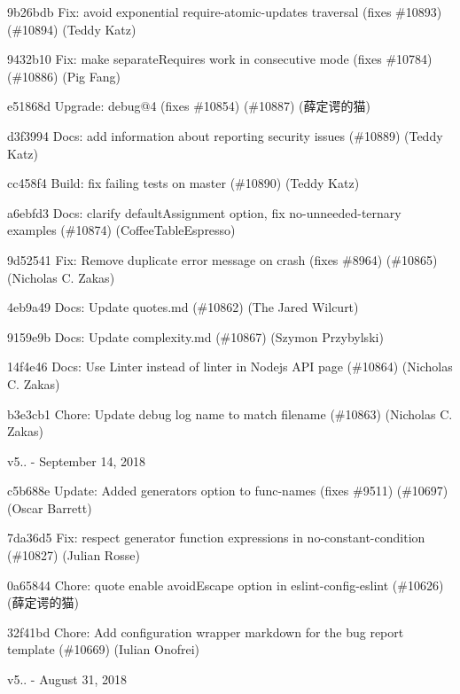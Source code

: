 \begin{DoxyItemize}
\item 9b26bdb Fix\+: avoid exponential require-\/atomic-\/updates traversal (fixes \#10893) (\#10894) (Teddy Katz)
\item 9432b10 Fix\+: make separate\+Requires work in consecutive mode (fixes \#10784) (\#10886) (Pig Fang)
\item e51868d Upgrade\+: debug@4 (fixes \#10854) (\#10887) (薛定谔的猫)
\item d3f3994 Docs\+: add information about reporting security issues (\#10889) (Teddy Katz)
\item cc458f4 Build\+: fix failing tests on master (\#10890) (Teddy Katz)
\item a6ebfd3 Docs\+: clarify default\+Assignment option, fix no-\/unneeded-\/ternary examples (\#10874) (Coffee\+Table\+Espresso)
\item 9d52541 Fix\+: Remove duplicate error message on crash (fixes \#8964) (\#10865) (Nicholas C. Zakas)
\item 4eb9a49 Docs\+: Update quotes.\+md (\#10862) (The Jared Wilcurt)
\item 9159e9b Docs\+: Update complexity.\+md (\#10867) (Szymon Przybylski)
\item 14f4e46 Docs\+: Use Linter instead of linter in Nodejs A\+PI page (\#10864) (Nicholas C. Zakas)
\item b3e3cb1 Chore\+: Update debug log name to match filename (\#10863) (Nicholas C. Zakas)
\end{DoxyItemize}

v5.. -\/ September 14, 2018


\begin{DoxyItemize}
\item c5b688e Update\+: Added generators option to func-\/names (fixes \#9511) (\#10697) (Oscar Barrett)
\item 7da36d5 Fix\+: respect generator function expressions in no-\/constant-\/condition (\#10827) (Julian Rosse)
\item 0a65844 Chore\+: quote enable avoid\+Escape option in eslint-\/config-\/eslint (\#10626) (薛定谔的猫)
\item 32f41bd Chore\+: Add configuration wrapper markdown for the bug report template (\#10669) (Iulian Onofrei)
\end{DoxyItemize}

v5.. -\/ August 31, 2018


